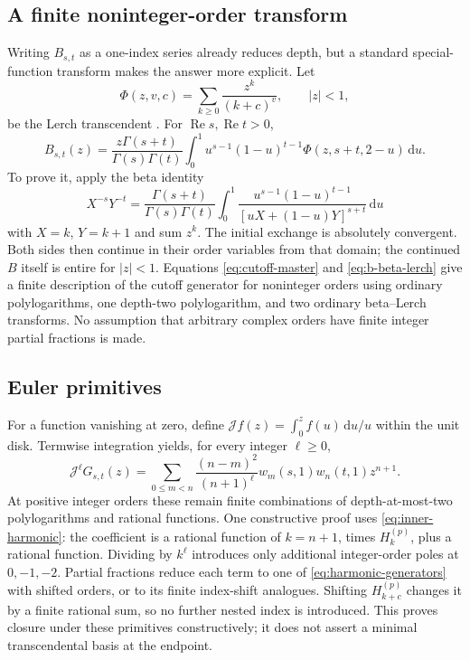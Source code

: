 \documentclass[11pt,a4paper]{article}
\numberwithin{equation}{section}
\theoremstyle{definition}
\theoremstyle{remark}
\newcommand{\dd}{\,\mathrm d}
\newcommand{\Rea}{\operatorname{Re}}
\begin{document}
\subsection{A finite noninteger-order transform}

Writing $B_{s,t}$ as a one-index series already reduces depth, but a
standard special-function transform makes the answer more explicit.
Let
\[
 \Phi(z,v,c)=\sum_{k\ge0}\frac{z^k}{(k+c)^v},\qquad |z|<1,
\]
be the Lerch transcendent \cite{dlmf:lerch}. For $\Rea s,\Rea t>0$,
\begin{equation}\label{eq:b-beta-lerch}
 B_{s,t}(z)=\frac{z\Gamma(s+t)}{\Gamma(s)\Gamma(t)}
 \int_0^1u^{s-1}(1-u)^{t-1}
       \Phi(z,s+t,2-u)\dd u.
\end{equation}
To prove it, apply the beta identity
\begin{equation}\label{eq:feynman-basic}
 X^{-s}Y^{-t}=\frac{\Gamma(s+t)}{\Gamma(s)\Gamma(t)}
 \int_0^1\frac{u^{s-1}(1-u)^{t-1}}{[uX+(1-u)Y]^{s+t}}\dd u
\end{equation}
with $X=k$, $Y=k+1$ and sum $z^k$. The initial exchange is absolutely
convergent. Both sides then continue in their order variables from
that domain; the continued $B$ itself is entire for $|z|<1$.
Equations \eqref{eq:cutoff-master} and \eqref{eq:b-beta-lerch}
give a finite description of the cutoff generator for noninteger
orders using ordinary polylogarithms, one depth-two polylogarithm,
and two ordinary beta--Lerch transforms. No assumption that arbitrary
complex orders have finite integer partial fractions is made.

\subsection{Euler primitives}

For a function vanishing at zero, define
$\mathcal J f(z)=\int_0^z f(u)\dd u/u$ within the unit disk.
Termwise integration yields, for every integer $\ell\ge0$,
\begin{equation}\label{eq:euler-primitives}
 \mathcal J^\ell G_{s,t}(z)
 =\sum_{0\le m<n}\frac{(n-m)^2}{(n+1)^\ell}
             w_m(s,1)w_n(t,1)z^{n+1}.
\end{equation}
At positive integer orders these remain finite combinations of
depth-at-most-two polylogarithms and rational functions. One constructive
proof uses \eqref{eq:inner-harmonic}: the coefficient is a rational
function of $k=n+1$, times $H_k^{(p)}$, plus a rational function.
Dividing by $k^\ell$ introduces only additional integer-order poles
at $0,-1,-2$. Partial fractions reduce each term to one of
\eqref{eq:harmonic-generators} with shifted orders, or to its finite
index-shift analogues. Shifting $H_{k+c}^{(p)}$ changes it by a
finite rational sum, so no further nested index is introduced.
This proves closure under these primitives constructively; it does
not assert a minimal transcendental basis at the endpoint.
\end{document}
